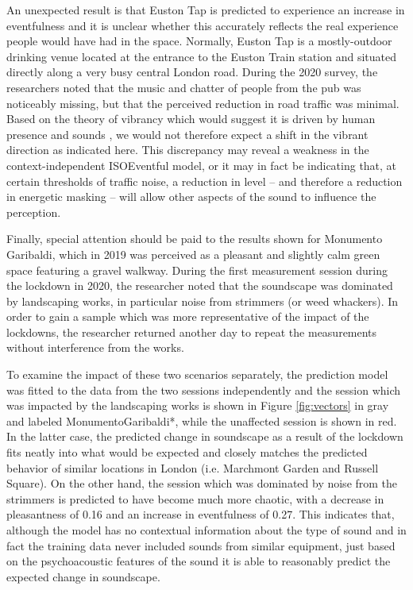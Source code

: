 An unexpected result is that Euston Tap is predicted to experience an increase in eventfulness and it is unclear whether this accurately reflects the real experience people would have had in the space. Normally, Euston Tap is a mostly-outdoor drinking venue located at the entrance to the Euston Train station and situated directly along a very busy central London road. During the 2020 survey, the researchers noted that the music and chatter of people from the pub was noticeably missing, but that the perceived reduction in road traffic was minimal. Based on the theory of vibrancy which would suggest it is driven by human presence and sounds \citep{aletta_towards_2018}, we would not therefore expect a shift in the vibrant direction as indicated here. This discrepancy may reveal a weakness in the context-independent ISOEventful model, or it may in fact be indicating that, at certain thresholds of traffic noise, a reduction in level -- and therefore a reduction in energetic masking -- will allow other aspects of the sound to influence the perception. 

Finally, special attention should be paid to the results shown for Monumento Garibaldi, which in 2019 was perceived as a pleasant and slightly calm green space featuring a gravel walkway. During the first measurement session during the lockdown in 2020, the researcher noted that the soundscape was dominated by landscaping works, in particular noise from strimmers (or weed whackers). In order to gain a sample which was more representative of the impact of the lockdowns, the researcher returned another day to repeat the measurements without interference from the works.

To examine the impact of these two scenarios separately, the prediction model was fitted to the data from the two sessions independently and the session which was impacted by the landscaping works is shown in Figure \ref{fig:vectors} in gray and labeled MonumentoGaribaldi*, while the unaffected session is shown in red. In the latter case, the predicted change in soundscape as a result of the lockdown fits neatly into what would be expected and closely matches the predicted behavior of similar locations in London (i.e. Marchmont Garden and Russell Square). On the other hand, the session which was dominated by noise from the strimmers is predicted to have become much more chaotic, with a decrease in pleasantness of 0.16 and an increase in eventfulness of 0.27. This indicates that, although the model has no contextual information about the type of sound and in fact the training data never included sounds from similar equipment, just based on the psychoacoustic features of the sound it is able to reasonably predict the expected change in soundscape. 

